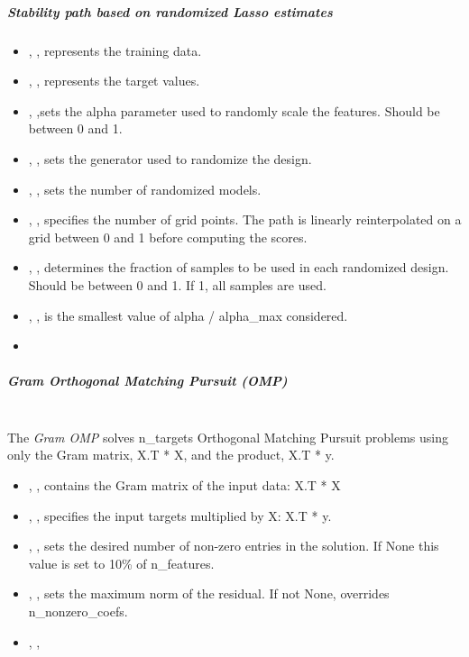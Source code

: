 \subparagraph{Stability path based on randomized Lasso estimates}
\mbox{}
\begin{itemize}
  \item {}, , represents the training data.
  \item {}, , represents the
  target values.
  \item {}, ,sets the alpha
  parameter used to randomly scale the
  features.
  Should be between 0 and 1.
  \item {}, , sets the generator used to randomize the
  design.
  \item {}, , sets the number of
  randomized models.
  \item {}, , specifies the number of grid
  points.
  The path is linearly reinterpolated on a grid between 0 and 1 before computing
  the scores.
  \item {}, , determines the
  fraction of samples to be used in each randomized design.
  Should be between 0 and 1.
  If 1, all samples are used.
  \item {}, , is the smallest value of 
  alpha / alpha\_max considered.
  \item \verDescriptionB{}
\end{itemize}

\subparagraph{Gram Orthogonal Matching Pursuit (OMP)}
\mbox{}
\\The \textit{Gram OMP} solves n\_targets Orthogonal Matching Pursuit problems
using only the Gram matrix, X.T * X, and the product, X.T * y.
%
\begin{itemize}
  \item {}, , 
  contains the Gram matrix of the input data: X.T * X
  \item {}, , specifies the input targets multiplied by X:
  X.T * y.
  \item {}, , sets the desired number of
  non-zero entries in the solution.
  If None this value is set to 10\% of n\_features.
  \item {}, , sets the maximum norm of the residual.
  If not None, overrides n\_nonzero\_coefs.
  \item {}, ,
\end{itemize}

